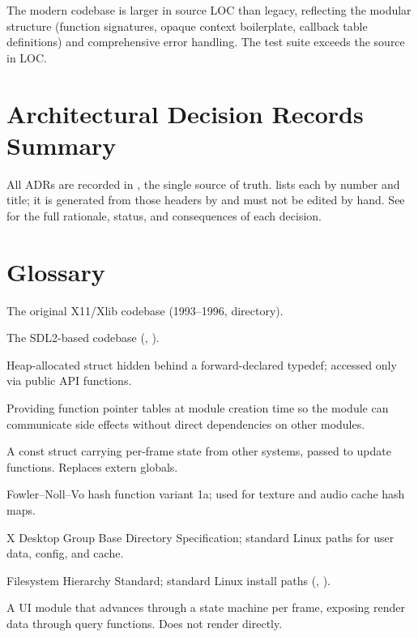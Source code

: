 \documentclass[11pt,a4paper]{article}
\begin{document}
The modern codebase is larger in source LOC than legacy, reflecting the modular structure (function signatures, opaque context boilerplate, callback table definitions) and comprehensive error handling. The test suite exceeds the source in LOC.


\section{Architectural Decision Records Summary}
\label{sec:adrs}

All ADRs are recorded in , the single source of
truth.  lists each by number and title; it is generated
from those headers by  and must not be
edited by hand. See  for the full rationale,
status, and consequences of each decision.




\section{Glossary}
\label{sec:glossary}

\begin{description}[nosep, leftmargin=3em]
    \item[Legacy] The original X11/Xlib codebase (1993--1996,  directory).
    \item[Modern] The SDL2-based codebase (, ).
    \item[Opaque context] Heap-allocated struct hidden behind a forward-declared typedef; accessed only via public API functions.
    \item[Callback injection] Providing function pointer tables at module creation time so the module can communicate side effects without direct dependencies on other modules.
    \item[Environment struct] A const struct carrying per-frame state from other systems, passed to update functions. Replaces extern globals.
    \item[FNV-1a] Fowler--Noll--Vo hash function variant 1a; used for texture and audio cache hash maps.
    \item[XDG] X Desktop Group Base Directory Specification; standard Linux paths for user data, config, and cache.
    \item[FHS] Filesystem Hierarchy Standard; standard Linux install paths (, ).
    \item[Sequencer] A UI module that advances through a state machine per frame, exposing render data through query functions. Does not render directly.
\end{description}
\end{document}
